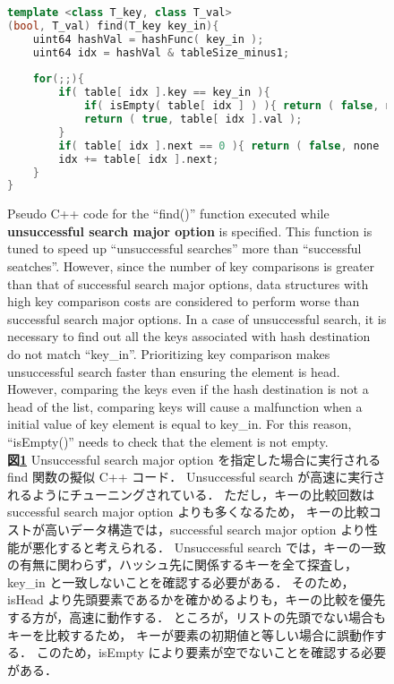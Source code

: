 \begin{figure}%
\begin{lstlisting}[language=C++]
template <class T_key, class T_val>
(bool, T_val) find(T_key key_in){
	uint64 hashVal = hashFunc( key_in );
	uint64 idx = hashVal & tableSize_minus1;
	
	for(;;){
		if( table[ idx ].key == key_in ){
			if( isEmpty( table[ idx ] ) ){ return ( false, none ); }
			return ( true, table[ idx ].val );
		}
		if( table[ idx ].next == 0 ){ return ( false, none ); }
		idx += table[ idx ].next;
	}
}
\end{lstlisting}
\caption{
  Pseudo C++ code for the ``find()'' function executed while {\bf unsuccessful search major option} is specified.
  This function is tuned to speed up ``unsuccessful searches'' more than ``successful seatches''.
  However, since the number of key comparisons is greater than that of successful search major options,
  data structures with high key comparison costs are considered to perform worse than successful search major options.
  In a case of unsuccessful search, it is necessary to find out all the keys associated with hash destination do not match ``key\_in''.
  Prioritizing key comparison makes unsuccessful search faster than ensuring the element is head.
  However, comparing the keys even if the hash destination is not a head of the list,
  comparing keys will cause a malfunction when a initial value of key element is equal to key\_in.
  For this reason, ``isEmpty()'' needs to check that the element is not empty.
  \\
  {\bf 図\ref{alg_find_usm}}
  Unsuccessful search major option を指定した場合に実行される find 関数の擬似 C++ コード．
  Unsuccessful search が高速に実行されるようにチューニングされている．
  ただし，キーの比較回数は successful search major option よりも多くなるため，
  キーの比較コストが高いデータ構造では，successful search major option より性能が悪化すると考えられる．
  Unsuccessful search では，キーの一致の有無に関わらず，ハッシュ先に関係するキーを全て探査し，key\_in と一致しないことを確認する必要がある．
  そのため，isHead より先頭要素であるかを確かめるよりも，キーの比較を優先する方が，高速に動作する．
  ところが，リストの先頭でない場合もキーを比較するため，
  キーが要素の初期値と等しい場合に誤動作する．
  このため，isEmpty により要素が空でないことを確認する必要がある．
}
\label{alg_find_usm}
\end{figure}



